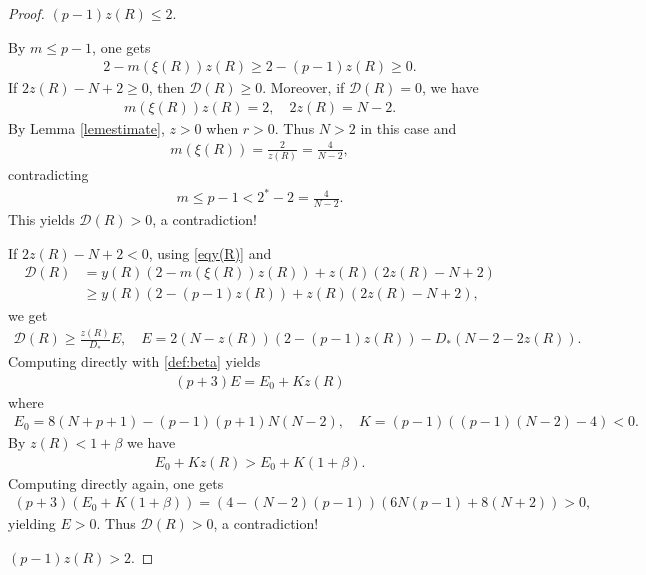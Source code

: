 \documentclass{article}
\theoremstyle{definition} \theoremstyle{remark}
\numberwithin{equation}{section}
\begin{document}
\begin{proof}
 $(p-1)z(R) \le 2$.

		By $m \le p-1$, one gets
		\begin{align*}
			2-m(\xi(R))z(R) \ge 2 - (p-1)z(R) \ge 0.
		\end{align*}
		If $2z(R) - N + 2 \ge 0$, then $\mathcal{D}(R) \ge 0$. Moreover, if $\mathcal{D}(R) = 0$, we have
		\begin{align*}
			m(\xi(R))z(R) = 2, \quad 2z(R) = N -2.
		\end{align*}
		By Lemma \ref{lemestimate}, $z > 0$ when $r > 0$. Thus $N > 2$ in this case and
		\begin{align*}
			m(\xi(R)) = \frac{2}{z(R)} = \frac{4}{N-2},
		\end{align*}
		contradicting
		\begin{align*}
			m \le p-1 < 2^*-2 = \frac{4}{N-2}.
		\end{align*}
		This yields $\mathcal{D}(R) > 0$, a contradiction!

		If $2z(R) - N + 2 < 0$, using \eqref{eqy(R)} and
		\begin{align*}
			\mathcal{D}(R) & = y(R)(2-m(\xi(R))z(R)) + z(R)(2z(R) - N +2) \\
			& \ge y(R)(2-(p-1)z(R)) + z(R)(2z(R) - N +2),
		\end{align*}
		we get
		\begin{align*}
			\mathcal{D}(R) \ge \frac{z(R)}{D_*}E, \quad E = 2(N-z(R))(2-(p-1)z(R)) - D_*(N-2-2z(R)).
		\end{align*}
		Computing directly with \eqref{def:beta} yields
		\begin{align*}
			(p+3)E = E_0 + Kz(R)
		\end{align*}
		where
		\begin{align*}
			E_0 = 8(N + p + 1) - (p-1)(p+1)N(N-2), \quad K = (p-1)((p-1)(N-2) - 4) < 0.
		\end{align*}
		By $z(R) < 1 + \beta$ we have
		\begin{align*}
			E_0 + Kz(R) > E_0 + K(1+\beta).
		\end{align*}
		Computing directly again, one gets
		\begin{align*}
			(p+3)(E_0 + K(1+\beta)) = (4- (N-2)(p-1))(6N(p-1) + 8(N+2)) > 0,
		\end{align*}
		yielding $E > 0$. Thus $\mathcal{D}(R) > 0$, a contradiction!

\vskip0.22in
 $(p-1)z(R) > 2$.


\end{proof}
\end{document}
